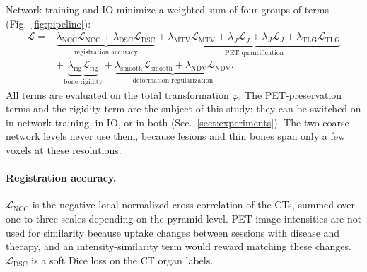 Network training and IO minimize a weighted sum of four groups of terms (Fig.~\ref{fig:pipeline}):
\begin{equation}
  \begin{aligned}
  \mathcal{L} = {} &
  \underbrace{\lambda_{\mathrm{NCC}}\mathcal{L}_{\mathrm{NCC}} + \lambda_{\mathrm{DSC}}\mathcal{L}_{\mathrm{DSC}}}_{\text{registration accuracy}}
  + \underbrace{\lambda_{\mathrm{MTV}}\mathcal{L}_{\mathrm{MTV}} + \lambda_{\overline{J}}\mathcal{L}_{\overline{J}} + \lambda_{J}\mathcal{L}_{J} + \lambda_{\mathrm{TLG}}\mathcal{L}_{\mathrm{TLG}}}_{\text{PET quantification}} \\
  & + \underbrace{\lambda_{\mathrm{rig}}\mathcal{L}_{\mathrm{rig}}}_{\text{bone rigidity}} + \underbrace{\lambda_{\mathrm{smooth}}\mathcal{L}_{\mathrm{smooth}} + \lambda_{\mathrm{NDV}}\mathcal{L}_{\mathrm{NDV}}}_{\text{deformation regularization}} .
  \end{aligned}
  \label{eq:objective}
\end{equation}
All terms are evaluated on the total transformation $\varphi$.
The PET-preservation terms and the rigidity term are the subject of this study; they can be switched on in network training, in IO, or in both (Sec.~\ref{sect:experiments}).
The two coarse network levels never use them, because lesions and thin bones span only a few voxels at these resolutions.

\paragraph{Registration accuracy.}
$\mathcal{L}_{\mathrm{NCC}}$ is the negative local normalized cross-correlation of the CTs, summed over one to three scales depending on the pyramid level.
PET image intensities are not used for similarity because uptake changes between sessions with disease and therapy, and an intensity-similarity term would reward matching these changes.
$\mathcal{L}_{\mathrm{DSC}}$ is a soft Dice loss on the CT organ labels.

